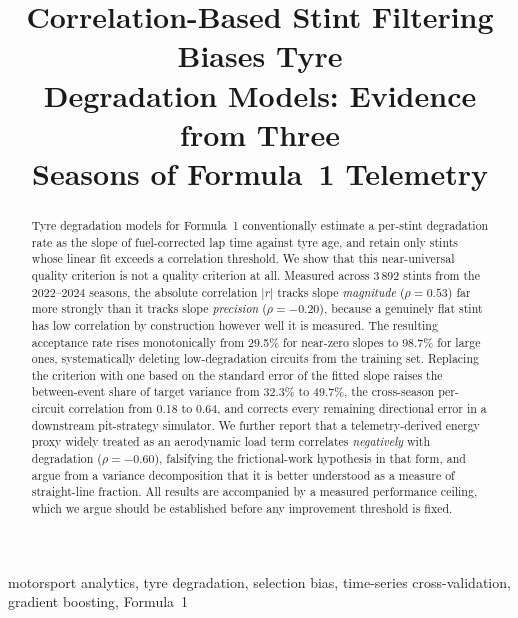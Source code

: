 \documentclass[conference]{IEEEtran}
\begin{document}
\title{Correlation-Based Stint Filtering Biases Tyre\\
Degradation Models: Evidence from Three\\
Seasons of Formula~1 Telemetry}

\author{
}

\maketitle

\begin{abstract}
Tyre degradation models for Formula~1 conventionally estimate a per-stint
degradation rate as the slope of fuel-corrected lap time against tyre age, and
retain only stints whose linear fit exceeds a correlation threshold. We show
that this near-universal quality criterion is not a quality criterion at all.
Measured across 3\,892 stints from the 2022--2024 seasons, the
absolute correlation $|r|$ tracks slope \emph{magnitude} ($\rho = 0.53$) far
more strongly than it tracks slope \emph{precision} ($\rho = -0.20$), because a
genuinely flat stint has low correlation by construction however well it is
measured. The resulting acceptance rate rises monotonically from 29.5\% for
near-zero slopes to 98.7\% for large ones, systematically deleting
low-degradation circuits from the training set. Replacing the criterion with
one based on the standard error of the fitted slope raises the between-event
share of target variance from 32.3\% to 49.7\%, the cross-season per-circuit
correlation from 0.18 to 0.64, and corrects every remaining directional error
in a downstream pit-strategy simulator. We further report that a
telemetry-derived energy proxy widely treated as an aerodynamic load term
correlates \emph{negatively} with degradation ($\rho = -0.60$), falsifying the
frictional-work hypothesis in that form, and argue from a variance
decomposition that it is better understood as a measure of straight-line
fraction. All results are accompanied by a measured performance ceiling, which
we argue should be established before any improvement threshold is fixed.
\end{abstract}

\begin{IEEEkeywords}
motorsport analytics, tyre degradation, selection bias, time-series
cross-validation, gradient boosting, Formula~1
\end{IEEEkeywords}
\end{document}
